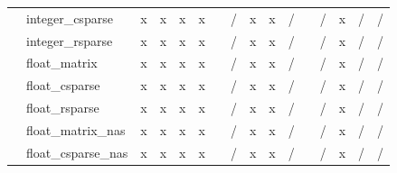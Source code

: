 \documentclass{article}
\begin{document}
\begin{longtable}{llllllllllllllll}
                & integer\_csparse          & \cellcolor[HTML]{B7E1CD}x & \cellcolor[HTML]{B7E1CD}x & \cellcolor[HTML]{B7E1CD}x & \cellcolor[HTML]{B7E1CD}x &  & \cellcolor[HTML]{F4CCCC}/ & \cellcolor[HTML]{B7E1CD}x & \cellcolor[HTML]{B7E1CD}x & \cellcolor[HTML]{F4CCCC}/ &  & \cellcolor[HTML]{F4CCCC}/ & \cellcolor[HTML]{B7E1CD}x & \cellcolor[HTML]{F4CCCC}/ & \cellcolor[HTML]{F4CCCC}/ \\
                & integer\_rsparse          & \cellcolor[HTML]{B7E1CD}x & \cellcolor[HTML]{B7E1CD}x & \cellcolor[HTML]{B7E1CD}x & \cellcolor[HTML]{B7E1CD}x &  & \cellcolor[HTML]{F4CCCC}/ & \cellcolor[HTML]{B7E1CD}x & \cellcolor[HTML]{B7E1CD}x & \cellcolor[HTML]{F4CCCC}/ &  & \cellcolor[HTML]{F4CCCC}/ & \cellcolor[HTML]{B7E1CD}x & \cellcolor[HTML]{F4CCCC}/ & \cellcolor[HTML]{F4CCCC}/ \\
                & float\_matrix             & \cellcolor[HTML]{B7E1CD}x & \cellcolor[HTML]{B7E1CD}x & \cellcolor[HTML]{B7E1CD}x & \cellcolor[HTML]{B7E1CD}x &  & \cellcolor[HTML]{F4CCCC}/ & \cellcolor[HTML]{B7E1CD}x & \cellcolor[HTML]{B7E1CD}x & \cellcolor[HTML]{F4CCCC}/ &  & \cellcolor[HTML]{F4CCCC}/ & \cellcolor[HTML]{B7E1CD}x & \cellcolor[HTML]{F4CCCC}/ & \cellcolor[HTML]{F4CCCC}/ \\
                & float\_csparse            & \cellcolor[HTML]{B7E1CD}x & \cellcolor[HTML]{B7E1CD}x & \cellcolor[HTML]{B7E1CD}x & \cellcolor[HTML]{B7E1CD}x &  & \cellcolor[HTML]{F4CCCC}/ & \cellcolor[HTML]{B7E1CD}x & \cellcolor[HTML]{B7E1CD}x & \cellcolor[HTML]{F4CCCC}/ &  & \cellcolor[HTML]{F4CCCC}/ & \cellcolor[HTML]{B7E1CD}x & \cellcolor[HTML]{F4CCCC}/ & \cellcolor[HTML]{F4CCCC}/ \\
                & float\_rsparse            & \cellcolor[HTML]{B7E1CD}x & \cellcolor[HTML]{B7E1CD}x & \cellcolor[HTML]{B7E1CD}x & \cellcolor[HTML]{B7E1CD}x &  & \cellcolor[HTML]{F4CCCC}/ & \cellcolor[HTML]{B7E1CD}x & \cellcolor[HTML]{B7E1CD}x & \cellcolor[HTML]{F4CCCC}/ &  & \cellcolor[HTML]{F4CCCC}/ & \cellcolor[HTML]{B7E1CD}x & \cellcolor[HTML]{F4CCCC}/ & \cellcolor[HTML]{F4CCCC}/ \\
                & float\_matrix\_nas        & \cellcolor[HTML]{B7E1CD}x & \cellcolor[HTML]{B7E1CD}x & \cellcolor[HTML]{B7E1CD}x & \cellcolor[HTML]{B7E1CD}x &  & \cellcolor[HTML]{F4CCCC}/ & \cellcolor[HTML]{B7E1CD}x & \cellcolor[HTML]{B7E1CD}x & \cellcolor[HTML]{F4CCCC}/ &  & \cellcolor[HTML]{F4CCCC}/ & \cellcolor[HTML]{B7E1CD}x & \cellcolor[HTML]{F4CCCC}/ & \cellcolor[HTML]{F4CCCC}/ \\
                & float\_csparse\_nas       & \cellcolor[HTML]{B7E1CD}x & \cellcolor[HTML]{B7E1CD}x & \cellcolor[HTML]{B7E1CD}x & \cellcolor[HTML]{B7E1CD}x &  & \cellcolor[HTML]{F4CCCC}/ & \cellcolor[HTML]{B7E1CD}x & \cellcolor[HTML]{B7E1CD}x & \cellcolor[HTML]{F4CCCC}/ &  & \cellcolor[HTML]{F4CCCC}/ & \cellcolor[HTML]{B7E1CD}x & \cellcolor[HTML]{F4CCCC}/ & \cellcolor[HTML]{F4CCCC}/ \\

\end{longtable}
\end{document}

